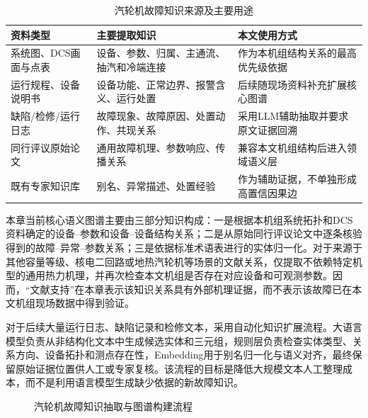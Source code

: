 \begin{table}[htbp]
\centering
\caption{汽轮机故障知识来源及主要用途}
\label{tab:kg_evidence_sources}
\begin{tabular}{p{3.0cm}p{5.2cm}p{5.2cm}}
\toprule
资料类型 & 主要提取知识 & 本文使用方式 \\
\midrule
系统图、DCS画面与点表 & 设备、参数、归属、主通流、抽汽和冷端连接 & 作为本机组结构关系的最高优先级依据 \\
运行规程、设备说明书 & 设备功能、正常边界、报警含义、运行处置 & 后续随现场资料补充扩展核心图谱 \\
缺陷/检修/运行日志 & 故障现象、故障原因、处置动作、共现关系 & 采用LLM辅助抽取并要求原文证据回溯 \\
同行评议原始论文 & 通用故障机理、参数响应、传播关系 & 兼容本文机组结构后进入领域语义层 \\
既有专家知识库 & 别名、异常描述、处置经验 & 作为辅助证据，不单独形成高置信因果边 \\
\bottomrule
\end{tabular}
\end{table}

本章当前核心语义图谱主要由三部分知识构成：一是根据本机组系统拓扑和DCS资料确定的设备--参数和设备--设备结构关系；二是从原始同行评议论文中逐条核验得到的故障--异常--参数关系；三是依据标准术语表进行的实体归一化。对于来源于其他容量等级、核电二回路或地热汽轮机等场景的文献关系，仅提取不依赖特定机型的通用热力机理，并再次检查本文机组是否存在对应设备和可观测参数。因而，“文献支持”在本章表示该知识关系具有外部机理证据，而不表示该故障已在本文机组现场数据中得到验证。

对于后续大量运行日志、缺陷记录和检修文本，采用自动化知识扩展流程。大语言模型负责从非结构化文本中生成候选实体和三元组，规则层负责检查实体类型、关系方向、设备拓扑和测点存在性，Embedding用于别名归一化与语义对齐，最终保留原始证据位置供人工或专家复核。该流程的目标是降低大规模文本人工整理成本，而不是利用语言模型生成缺少依据的新故障知识。

\begin{figure}[htbp]
\centering
{}
\caption{汽轮机故障知识抽取与图谱构建流程}
\label{fig:kg_construction_flow}
\end{figure}

